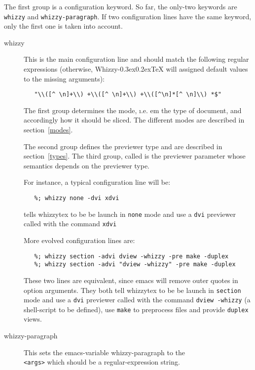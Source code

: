 \documentclass{article}
\makeatletter
\let \lst \verb
\def \whizzy {{Whizzy\kern -0.3ex\raise 0.2ex\hbox{\let \@\relax\TeX}}}
\makeatother
\begin{document}
The first group is a configuration keyword. 
So far, the only-two  keywords are \lst"whizzy" and 
\lst"whizzy-paragraph". If two configuration
lines have the same keyword, only the first one is taken into
account.
\begin{description}
\item[whizzy]
This is the main configuration line and should match the following regular
expressions (otherwise, {\whizzy} will assigned default values to the
missing arguments): 
\begin{verbatim}
   "\\([^ \n]+\\) +\\([^ \n]+\\) +\\([^\n]*[^ \n]\\) *$"
\end{verbatim}%
The first group determines the mode, {\i.e. em} the type of document, and
accordingly how it should be sliced.  The different modes are described in
section~\ref {modes}.

The second group defines the previewer type and are described in
section~\ref{types}.  The third group, called is the previewer parameter
whose semantics depends on the previewer type.

For instance, a typical configuration line will be:
\begin{verbatim}
   %; whizzy none -dvi xdvi
\end{verbatim}
tells whizzytex to be be launch in \lst"none" mode and use a \lst"dvi"
previewer called with the command \lst"xdvi"

More evolved configuration lines are:
\begin{verbatim}
   %; whizzy section -advi dview -whizzy -pre make -duplex
   %; whizzy section -advi "dview -whizzy" -pre make -duplex
\end{verbatim}
These two lines are equivalent, since emacs will remove outer quotes in
option arguments. They both tell whizzytex to be be launch in \lst"section"
mode and use a \lst"dvi" previewer called with the command 
\lst"dview -whizzy" 
(a shell-script to be defined), use \lst"make" to preprocess files
and provide \lst"duplex" views.

\item[whizzy-paragraph]
This sets the emacs-variable whizzy-paragraph to the \\
\lst"<args>" which should be a regular-expression string. 
\end{description} 
\end{document}
